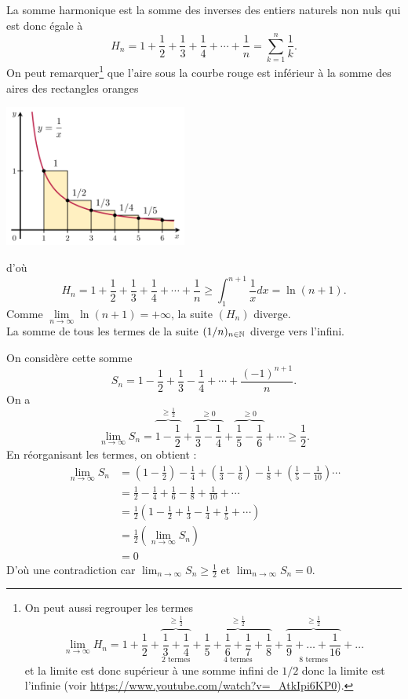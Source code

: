 \documentclass{book}
\begin{document}
\begin{Exemple}
La somme harmonique est la somme des inverses des entiers naturels non nuls qui est donc égale à
$$ H_{n}=1+{\frac {1}{2}}+{\frac {1}{3}}+{\frac {1}{4}}+\cdots +{\frac {1}{n}}=\sum _{k=1}^{n}{\frac {1}{k}}.$$
On peut remarquer\footnote{On peut aussi regrouper les termes 
$$ \lim_{n\to\infty}H_{n}=1+{\frac {1}{2}}+\overbrace{\frac {1}{3}+\frac {1}{4}}^{\geq \frac 1 2}_{2 \text{ termes}}+\overbrace{\frac {1}{5}+\frac {1}{6}+\frac {1}{7}+\frac {1}{8}}^{\geq \frac 1 2}_{4 \text{ termes}}+\overbrace{\frac {1}{9}+\dots+\frac {1}{16}}^{\geq \frac 1 2}_{8 \text{ termes}}+\dots$$
et la limite est donc supérieur à une somme infini de $1/2$ donc la limite est l'infinie (voir \url{https://www.youtube.com/watch?v=_AtkIpi6KP0}).} que l'aire sous la courbe rouge est inférieur à la somme des aires des rectangles oranges 
\begin{center}
\includegraphics[width=6cm]{serie_numerique_fig_serie_harmonique}
\end{center}
d'où
$$ H_{n}=1+{\frac {1}{2}}+{\frac {1}{3}}+{\frac {1}{4}}+\cdots +{\frac {1}{n}}\geq\int_1^{n+1}\frac 1 x dx=\ln(n+1).$$
Comme  $\lim\limits_{n\to\infty}\ln(n+1)=+\infty$, la suite $(H_n)$ diverge.\\
La somme de tous les termes de la suite $(1/n)_{n\in\mathbb{N}}$ diverge vers l'infini.
\end{Exemple}
\begin{Exemple}
On considère cette somme
$$ S_{n}=1-{\frac {1}{2}}+{\frac {1}{3}}-{\frac {1}{4}}+\cdots +{\frac {(-1)^{n+1}}{n}}.$$
On a $$\lim_{n\to\infty}S_{n}=\overbrace{1-{\frac {1}{2}}}^{\geq \frac 1 2}+\overbrace{\frac {1}{3}-\frac {1}{4}}^{\geq  0}+\overbrace{\frac {1}{5}-\frac {1}{6}}^{\geq  0}+\cdots \geq \frac 1 2.$$
En réorganisant les termes, on obtient :
	$$\begin{aligned}
	\lim_{n\to\infty}S_{n}&= \left(1 - \frac 1 2\right) - \frac 1 4 + \left(\frac 1 3 - \frac 1 6\right)- \frac 1  8+ \left(\frac 1 5 - \frac{1}{10}\right)\cdots  \\
					     &=\frac 1 2 - \frac 1 4  + \frac 1 6 - \frac 1  8+  \frac{1}{10}+ \cdots\\
					     &=\frac 1 2 (1-{\frac {1}{2}}+{\frac {1}{3}}-{\frac {1}{4}}+{\frac {1}{5}}+\cdots)\\
					     &=\frac 1 2 (\lim_{n\to\infty}S_{n})\\
					     &=0
	\end{aligned}$$
D'où une contradiction car $\lim_{n\to\infty}S_{n}\geq \frac 1 2 $ et $\lim_{n\to\infty}S_{n}=0$.
\end{Exemple}
\newpage
\end{document}
